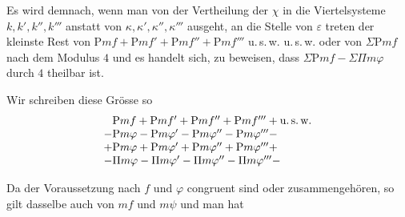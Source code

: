 Es wird demnach, wenn man von der Vertheilung der $\chi$ in die Viertelsysteme $k,k',k'',k'''$ anstatt von $\kappa,\kappa',\kappa'',\kappa'''$ ausgeht, an die Stelle von $\varepsilon$ treten der kleinste Rest von $\mathrm{P}mf+\mathrm{P}mf'+\mathrm{P}mf''+\mathrm{P}mf'''$ u.\,s.\,w. u.\,s.\,w. oder von $\Sigma\mathrm{P}mf$ nach dem Modulus $4$ und es handelt sich, zu beweisen, dass $\Sigma\mathrm{P}mf-\Sigma\Pi m\varphi$ durch $4$ theilbar ist.

Wir schreiben diese Grösse so
\[
\begin{array}{l}
\phantom{+}\mathrm{P}mf+\mathrm{P}mf'+\mathrm{P}mf''+\mathrm{P}mf'''+\text{u.\,s.\,w.}\\
-\mathrm{P}m\varphi-\mathrm{P}m\varphi'-\mathrm{P}m\varphi''-\mathrm{P}m\varphi'''-\\
+\mathrm{P}m\varphi+\mathrm{P}m\varphi'+\mathrm{P}m\varphi''+\mathrm{P}m\varphi'''+\\
-\Pi m\varphi-\Pi m\varphi'-\Pi m\varphi''-\Pi m\varphi'''-
\end{array}
\]

Da der Voraussetzung nach $f$ und $\varphi$ congruent sind oder zusammengehören, so gilt dasselbe auch von $mf$ und $m\psi$ und man hat

